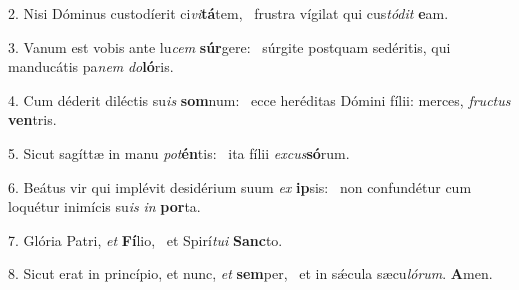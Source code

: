 2. Nisi Dóminus custodíerit ci\textit{vi}\textbf{tá}tem, \ast\  frustra vígilat qui cus\textit{tó}\textit{dit} \textbf{e}am.\

3. Vanum est vobis ante lu\textit{cem} \textbf{súr}gere: \ast\  súrgite postquam sedéritis, qui manducátis pa\textit{nem} \textit{do}\textbf{ló}ris.\

4. Cum déderit diléctis su\textit{is} \textbf{som}num: \ast\  ecce heréditas Dómini fílii: merces, \textit{fruc}\textit{tus} \textbf{ven}tris.\

5. Sicut sagíttæ in manu \textit{pot}\textbf{én}tis: \ast\  ita fílii \textit{ex}\textit{cus}\textbf{só}rum.\

6. Beátus vir qui implévit desidérium suum \textit{ex} \textbf{ip}sis: \ast\  non confundétur cum loquétur inimícis su\textit{is} \textit{in} \textbf{por}ta.\

7. Glória Patri, \textit{et} \textbf{Fí}lio, \ast\  et Spirí\textit{tu}\textit{i} \textbf{Sanc}to.\

8. Sicut erat in princípio, et nunc, \textit{et} \textbf{sem}per, \ast\  et in sǽcula sæcu\textit{ló}\textit{rum}. \textbf{A}men.\

